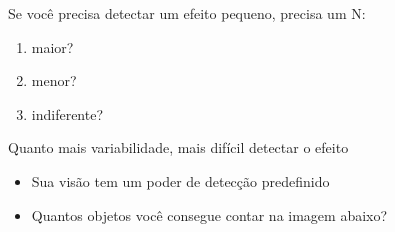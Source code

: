 \documentclass{beamer}
\begin{document}
\begin{frame}{\scriptsize }
  \begin{center}
    Se você precisa detectar um efeito pequeno, precisa um N:

    \bigskip
    \begin{enumerate}
      \footnotesize
    \item maior?
    \item menor?
    \item indiferente?
    \end{enumerate}
  \end{center}
\end{frame}

\begin{frame}{\scriptsize Quanto mais variabilidade, mais difícil detectar o efeito}
  \begin{itemize}
    \scriptsize
  \item Sua visão tem um poder de detecção predefinido
  \item Quantos objetos você consegue contar na imagem abaixo?
  \end{itemize}


\end{frame}
\end{document}
